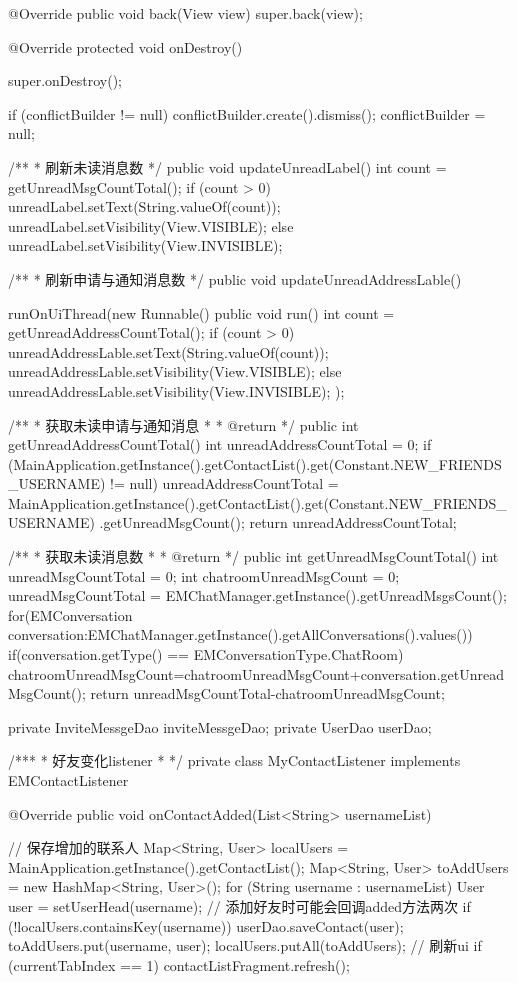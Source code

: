 {	@Override
	public void back(View view) {
		super.back(view);
	}

	@Override
	protected void onDestroy() {
		super.onDestroy();		

		if (conflictBuilder != null) {
			conflictBuilder.create().dismiss();
			conflictBuilder = null;
		}

	}

	/**
	 * 刷新未读消息数
	 */
	public void updateUnreadLabel() {
		int count = getUnreadMsgCountTotal();
		if (count > 0) {
			unreadLabel.setText(String.valueOf(count));
			unreadLabel.setVisibility(View.VISIBLE);
		} else {
			unreadLabel.setVisibility(View.INVISIBLE);
		}
	}

	/**
	 * 刷新申请与通知消息数
	 */
	public void updateUnreadAddressLable() {
		runOnUiThread(new Runnable() {
			public void run() {
				int count = getUnreadAddressCountTotal();
				if (count > 0) {
					unreadAddressLable.setText(String.valueOf(count));
					unreadAddressLable.setVisibility(View.VISIBLE);
				} else {
					unreadAddressLable.setVisibility(View.INVISIBLE);
				}
			}
		});

	}

	/**
	 * 获取未读申请与通知消息
	 * 
	 * @return
	 */
	public int getUnreadAddressCountTotal() {
		int unreadAddressCountTotal = 0;
		if (MainApplication.getInstance().getContactList().get(Constant.NEW_FRIENDS_USERNAME) != null)
			unreadAddressCountTotal = MainApplication.getInstance().getContactList().get(Constant.NEW_FRIENDS_USERNAME)
					.getUnreadMsgCount();
		return unreadAddressCountTotal;
	}

	/**
	 * 获取未读消息数
	 * 
	 * @return
	 */
	public int getUnreadMsgCountTotal() {
		int unreadMsgCountTotal = 0;
		int chatroomUnreadMsgCount = 0;
		unreadMsgCountTotal = EMChatManager.getInstance().getUnreadMsgsCount();
		for(EMConversation conversation:EMChatManager.getInstance().getAllConversations().values()){
			if(conversation.getType() == EMConversationType.ChatRoom)
			chatroomUnreadMsgCount=chatroomUnreadMsgCount+conversation.getUnreadMsgCount();
		}
		return unreadMsgCountTotal-chatroomUnreadMsgCount;
	}

	private InviteMessgeDao inviteMessgeDao;
	private UserDao userDao;

	/***
	 * 好友变化listener
	 * 
	 */
	private class MyContactListener implements EMContactListener {

		@Override
		public void onContactAdded(List<String> usernameList) {
			// 保存增加的联系人
			Map<String, User> localUsers = MainApplication.getInstance().getContactList();
			Map<String, User> toAddUsers = new HashMap<String, User>();
			for (String username : usernameList) {
				User user = setUserHead(username);
				// 添加好友时可能会回调added方法两次
				if (!localUsers.containsKey(username)) {
					userDao.saveContact(user);
				}
				toAddUsers.put(username, user);
			}
			localUsers.putAll(toAddUsers);
			// 刷新ui
			if (currentTabIndex == 1)
				contactListFragment.refresh();

}}}
